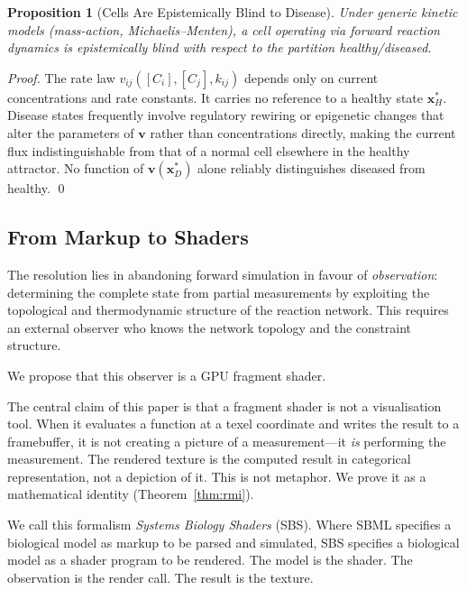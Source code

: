 \documentclass[11pt,twocolumn,a4paper]{article}
\newtheorem{proposition}[theorem]{Proposition}
\begin{document}
\begin{proposition}[Cells Are Epistemically Blind to Disease]
\label{prop:blind}
Under generic kinetic models (mass-action, Michaelis--Menten), a cell
operating via forward reaction dynamics is epistemically blind with
respect to the partition \emph{healthy}/\emph{diseased}.
\end{proposition}

\begin{proof}
The rate law $v_{ij}([C_i], [C_j], k_{ij})$ depends only on current
concentrations and rate constants.  It carries no reference to a
healthy state $\mathbf{x}_H^*$.  Disease states frequently involve
regulatory rewiring or epigenetic changes that alter the parameters of
$\mathbf{v}$ rather than concentrations directly, making the current
flux indistinguishable from that of a normal cell elsewhere in the
healthy attractor.  No function of $\mathbf{v}(\mathbf{x}_D^*)$ alone
reliably distinguishes diseased from healthy.  \qed
\end{proof}

\subsection{From Markup to Shaders}

The resolution lies in abandoning forward simulation in favour of
\emph{observation}: determining the complete state from partial
measurements by exploiting the topological and thermodynamic structure
of the reaction network.  This requires an external observer who knows
the network topology and the constraint structure.

We propose that this observer is a GPU fragment shader.

The central claim of this paper is that a fragment shader is not a
visualisation tool.  When it evaluates a function at a texel coordinate
and writes the result to a framebuffer, it is not creating a picture
of a measurement---it \emph{is} performing the measurement.  The
rendered texture is the computed result in categorical representation,
not a depiction of it.  This is not metaphor.  We prove it as a
mathematical identity (Theorem~\ref{thm:rmi}).

We call this formalism \emph{Systems Biology Shaders} (SBS).  Where
SBML specifies a biological model as markup to be parsed and
simulated, SBS specifies a biological model as a shader program to be
rendered.  The model is the shader.  The observation is the render
call.  The result is the texture.
\end{document}
